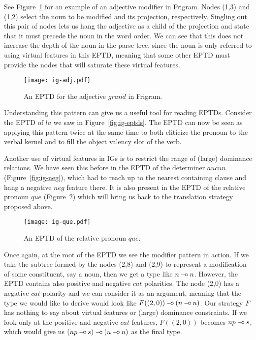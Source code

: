 See Figure~\ref{fig:ig-adj} for an example of an adjective modifier in
Frigram. Nodes (1,3) and (1,2) select the noun to be modified and its
projection, respectively. Singling out this pair of nodes lets us hang
the adjective as a child of the projection and state that it must
precede the noun in the word order. We can see that this does not
increase the depth of the noun in the parse tree, since the noun is only
referred to using virtual features in this EPTD, meaning that some other
EPTD must provide the nodes that will saturate these virtual features.

\begin{figure}
  \centering
  \texttt{[image: ig-adj.pdf]}
  \caption{\label{fig:ig-adj} An EPTD for the adjective $grand$ in
    Frigram.}
\end{figure}

Understanding this pattern can give us a useful tool for reading
EPTDs. Consider the EPTD of $la$ we saw in
Figure~\ref{fig:ig-eptds}. The EPTD can now be seen as applying this
pattern twice at the same time to both cliticize the pronoun to the
verbal kernel and to fill the object valency slot of the
verb.

Another use of virtual features in IGs is to restrict the range of
(large) dominance relations. We have seen this before in the EPTD of the
determiner $aucun$ (Figure~\ref{fig:ig-neg}), which had to reach up to
the nearest containing clause and hang a negative $neg$ feature there.
It is also present in the EPTD of the relative pronoun $que$
(Figure~\ref{fig:ig-que}) which will bring us back to the translation
strategy proposed above.

\begin{figure}
  \centering
  \texttt{[image: ig-que.pdf]}
  \caption{\label{fig:ig-que} An EPTD of the relative pronoun $que$.}
\end{figure}

Once again, at the root of the EPTD we see the modifier pattern in
action. If we take the subtree formed by the nodes (2,8) and (2,9) to
represent a modification of some constituent, say a noun, then we get a
type like $n \mathbin{{-}\mkern-3.5mu{\circ}} n$. However, the EPTD contains also positive and
negative $cat$ polarities. The node (2,0) has a negative $cat$ polarity
and we can consider it as an argument, meaning that the type we would
like to derive would look like $F((2,0)) \mathbin{{-}\mkern-3.5mu{\circ}} (n \mathbin{{-}\mkern-3.5mu{\circ}} n)$. Our
strategy $F$ has nothing to say about virtual features or (large)
dominance constraints. If we look only at the positive and negative
$cat$ features, $F((2,0))$ becomes $np \mathbin{{-}\mkern-3.5mu{\circ}} s$, which would give us
$(np \mathbin{{-}\mkern-3.5mu{\circ}} s) \mathbin{{-}\mkern-3.5mu{\circ}} (n \mathbin{{-}\mkern-3.5mu{\circ}} n)$ as the final type.

